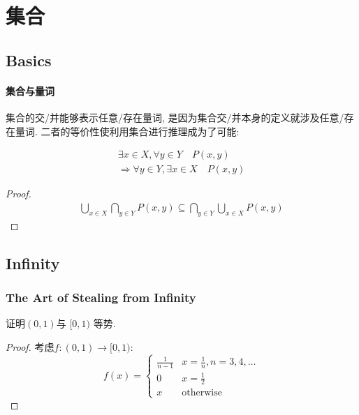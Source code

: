 \chapter{集合}
\section{Basics}

\subsubsection{集合与量词}

集合的交/并能够表示任意/存在量词, 是因为集合交/并本身的定义就涉及任意/存在量词. 二者的等价性使利用集合进行推理成为了可能:

\begin{theorem}
    \begin{align*}
        \exists x \in X, \forall y \in Y \quad P(x,y) \\
        \Rightarrow \forall y \in Y, \exists x \in X \quad P(x,y)
    \end{align*}
\end{theorem}

\begin{proof}
    \begin{align*}
        \bigcup_{x \in X} \bigcap_{y \in Y} P(x,y) \subseteq
        \bigcap_{y \in Y} \bigcup_{x \in X} P(x,y)
    \end{align*}
\end{proof}

\section{Infinity}
\subsection{The Art of Stealing from Infinity}

\begin{problem}
    证明\((0,1)\)与 \([0,1)\) 等势.
\end{problem}

\begin{proof}
    考虑\(f:(0,1) \to [0,1)\):\[
        f(x) =
        \begin{cases}
            \frac{1}{n-1} & x =\frac{1}{n}, n=3,4,\dots  \\
            0 & x=\frac{1}{2} \\
            x & \text{otherwise}
        \end{cases}
    \]
\end{proof}

